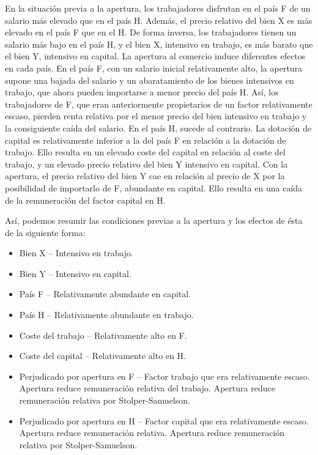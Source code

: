 \documentclass{nuevotema}
\begin{document}
En la situación previa a la apertura, los trabajadores disfrutan en el país F de un salario más elevado que en el país H. Además, el precio relativo del bien X es más elevado en el país F que en el H. De forma inversa, los trabajadores tienen un salario más bajo en el país H, y el bien X, intensivo en trabajo, es más barato que el bien Y, intensivo en capital. La apertura al comercio induce diferentes efectos en cada país. En el país F, con un salario inicial relativamente alto, la apertura supone una bajada del salario y un abaratamiento de los bienes intensivos en trabajo, que ahora pueden importarse a menor precio del país H. Así, los trabajadores de F, que eran anteriormente propietarios de un factor relativamente escaso, pierden renta relativa por el menor precio del bien intensivo en trabajo y la consiguiente caída del salario. En el país H, sucede al contrario. La dotación de capital es relativamente inferior a la del país F en relación a la dotación de trabajo. Ello resulta en un elevado coste del capital en relación al coste del trabajo, y un elevado precio relativo del bien Y intensivo en capital. Con la apertura, el precio relativo del bien Y cae en relación al precio de X por la posibilidad de importarlo de F, abundante en capital. Ello resulta en una caída de la remuneración del factor capital en H.

Así, podemos resumir las condiciones previas a la apertura y los efectos de ésta de la siguiente forma: 

\begin{itemize}
	\item Bien X -- Intensivo en trabajo.
	\item Bien Y -- Intensivo en capital. 
	\item País F -- Relativamente abundante en capital. 
	\item País H -- Relativamente abundante en trabajo.
	\item Coste del trabajo -- Relativamente alto en F.
	\item Coste del capital -- Relativamente alto en H.
	\item Perjudicado por apertura en F -- Factor trabajo que era relativamente escaso. Apertura reduce remuneración relativa del trabajo. Apertura reduce remuneración relativa por Stolper-Samuelson.
	\item Perjudicado por apertura en H -- Factor capital que era relativamente escaso. Apertura reduce remuneración relativa. Apertura reduce remuneración relativa por Stolper-Samuelson.
\end{itemize}
\end{document}
